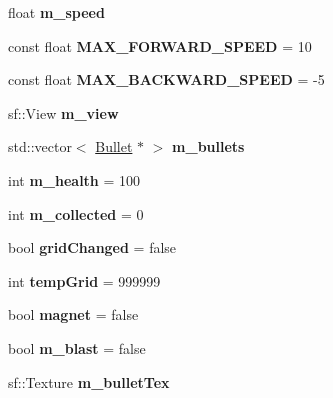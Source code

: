\begin{DoxyCompactItemize}
float {\bfseries m\+\_\+speed}
\item 
\mbox{\label{class_player_ad5920a8edc3ef9fd3ed54f08e587cf07}} 
const float {\bfseries M\+A\+X\+\_\+\+F\+O\+R\+W\+A\+R\+D\+\_\+\+S\+P\+E\+ED} = 10
\item 
\mbox{\label{class_player_ab820c966df30eb89b8a33581fa43e6bd}} 
const float {\bfseries M\+A\+X\+\_\+\+B\+A\+C\+K\+W\+A\+R\+D\+\_\+\+S\+P\+E\+ED} = -\/5
\item 
\mbox{\label{class_player_ac6061be359d623602e2a5cff24be2b84}} 
sf\+::\+View {\bfseries m\+\_\+view}
\item 
\mbox{\label{class_player_ad23fd140bea15607698bead2ec0b99dc}} 
std\+::vector$<$ \mbox{\hyperlink{class_bullet}{Bullet}} $\ast$ $>$ {\bfseries m\+\_\+bullets}
\item 
\mbox{\label{class_player_a467e9e6a23ea7d9e999382c58d0db9aa}} 
int {\bfseries m\+\_\+health} = 100
\item 
\mbox{\label{class_player_a43a4de8d47e7520a8a593ae64ba5bd35}} 
int {\bfseries m\+\_\+collected} = 0
\item 
\mbox{\label{class_player_a6a44eab5c246e4382b6c23e83c8798d9}} 
bool {\bfseries grid\+Changed} = false
\item 
\mbox{\label{class_player_ab7dc439bb34c70b6aeccba13d34688f6}} 
int {\bfseries temp\+Grid} = 999999
\item 
\mbox{\label{class_player_a36aac9e1a9673659f5ee7b4693e59198}} 
bool {\bfseries magnet} = false
\item 
\mbox{\label{class_player_a57fd53d219fc5b671644194ca301f483}} 
bool {\bfseries m\+\_\+blast} = false
\item 
\mbox{\label{class_player_ab2c273de778f25ab49db698c57037f5e}} 
sf\+::\+Texture {\bfseries m\+\_\+bullet\+Tex}
\end{DoxyCompactItemize}
